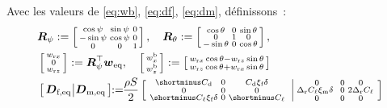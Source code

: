 \begin{algorithm}
\begin{algorithmic}[1]
        
\State Avec les valeurs de \eqref{eq:wb}, \eqref{eq:df}, \eqref{eq:dm}, définissons : 
\begin{align*}
    & \boldsymbol{R}_\psi := \smallmat{ \cos \psi & \sin \psi & 0 \\ -\sin \psi & \cos \psi & 0 \\ 0 & 0 & 1 },    \quad 
      \boldsymbol{R}_\theta := \smallmat{ \cos \theta & 0 & \sin \theta \\ 0 & 1 & 0 \\ -\sin \theta & 0 & \cos \theta },         \\
     &\smallmat{w_{\text{r}x} \\ 0 \\ w_{\text{r}z}} :=  \boldsymbol{R}_\psi^\top \boldsymbol{w}_{\text{eq}}, \quad
    \smallmat{w^{\text{b}}_{x} \\ w^{\text{b}}_{z}} := \smallmat{w_{\text{r}x} \cos \theta -   w_{\text{r}z} \sin\theta \\ w_{\text{r}z} \cos \theta + w_{\text{r}x} \sin \theta }
     \\
     &\left[ \! \! \begin{array}{c|c} 
     \boldsymbol{D}_{\text{f,eq}} \! \! &  \! \! \boldsymbol{D}_{\text{m,eq}}
     \end{array} \! \!\right] \! \! := \! \! \frac{\rho S}{2} \left[\begin{array}{c|c} \! \! \begin{smallmatrix}
                \shortminus C_{\text{d}} & 0 & C_{\text{d}}\xi_{\text{f}} \delta\\
                0 & 0 & 0\\
                \shortminus C_{\ell}\xi_{\text{f}} \delta & 0 & \shortminus C_{\ell}
            \end{smallmatrix} &  \! \! \begin{smallmatrix}
                0 & 0 & 0\\
               \Delta_{\text{r}}C_{\ell}\xi_{\text{m}}\delta\ & 0 & 2\Delta_{\text{r}}C_{\ell}\\
                0 & 0 & 0
            \end{smallmatrix} \end{array} \! \!\right]
\end{align*}


\end{algorithmic}
\end{algorithm}
